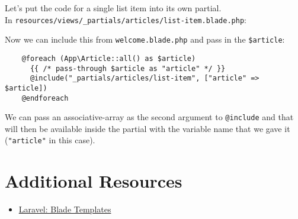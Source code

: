 Let's put the code for a single list item into its own partial.
\\

In \texttt{resources/views/\_partials/articles/list-item.blade.php}:


Now we can include this from \texttt{welcome.blade.php} and pass in the \texttt{\$article}:

\begin{verbatim}
    @foreach (App\Article::all() as $article)
      {{ /* pass-through $article as "article" */ }}
      @include("_partials/articles/list-item", ["article" => $article])
    @endforeach
\end{verbatim}

We can pass an associative-array as the second argument to \texttt{@include} and that will then be available inside the partial with the variable name that we gave it (\texttt{"article"} in this case).

\section{Additional Resources}

\begin{itemize}[leftmargin=*]
    \item \href{http://laravel.com/docs/master/blade}{Laravel: Blade Templates}
\end{itemize}
